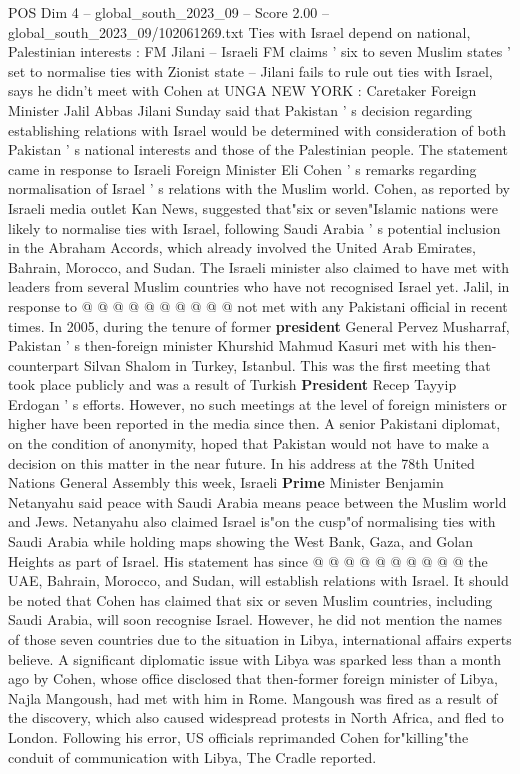 \begin{textsample}{POS Dim 4 – global\_south\_2023\_09 – Score 2.00 – global\_south\_2023\_09/102061269.txt}  \label{ex:f4_pos_437}
Ties with Israel depend on national, Palestinian interests : FM Jilani -- Israeli FM claims ' six to seven Muslim states ' set to normalise ties with Zionist state -- Jilani fails to rule out ties with Israel, says he didn't meet with Cohen at UNGA NEW YORK : Caretaker Foreign Minister Jalil Abbas Jilani Sunday said that Pakistan ' s decision regarding establishing relations with Israel would be determined with consideration of both Pakistan ' s national interests and those of the Palestinian people.
The statement came in response to Israeli Foreign Minister Eli Cohen ' s remarks regarding normalisation of Israel ' s relations with the Muslim world.
Cohen, as reported by Israeli media outlet Kan News, suggested that"six or seven"Islamic nations were likely to normalise ties with Israel, following Saudi Arabia ' s potential inclusion in the Abraham Accords, which already involved the United Arab Emirates, Bahrain, Morocco, and Sudan.
The Israeli minister also claimed to have met with leaders from several Muslim countries who have not recognised Israel yet.
Jalil, in response to @ @ @ @ @ @ @ @ @ @ not met with any Pakistani official in recent times.
In 2005, during the tenure of former \textbf{president} General Pervez Musharraf, Pakistan ' s then-foreign minister Khurshid Mahmud Kasuri met with his then-counterpart Silvan Shalom in Turkey, Istanbul.
This was the first meeting that took place publicly and was a result of Turkish \textbf{President} Recep Tayyip Erdogan ' s efforts.
However, no such meetings at the level of foreign ministers or higher have been reported in the media since then.
A senior Pakistani diplomat, on the condition of anonymity, hoped that Pakistan would not have to make a decision on this matter in the near future.
In his address at the 78th United Nations General Assembly this week, Israeli \textbf{Prime} Minister Benjamin Netanyahu said peace with Saudi Arabia means peace between the Muslim world and Jews.
Netanyahu also claimed Israel is"on the cusp"of normalising ties with Saudi Arabia while holding maps showing the West Bank, Gaza, and Golan Heights as part of Israel.
His statement has since @ @ @ @ @ @ @ @ @ @ the UAE, Bahrain, Morocco, and Sudan, will establish relations with Israel.
It should be noted that Cohen has claimed that six or seven Muslim countries, including Saudi Arabia, will soon recognise Israel.
However, he did not mention the names of those seven countries due to the situation in Libya, international affairs experts believe.
A significant diplomatic issue with Libya was sparked less than a month ago by Cohen, whose office disclosed that then-former foreign minister of Libya, Najla Mangoush, had met with him in Rome.
Mangoush was fired as a result of the discovery, which also caused widespread protests in North Africa, and fled to London.
Following his error, US officials reprimanded Cohen for"killing"the conduit of communication with Libya, The Cradle reported.

\end{textsample}
